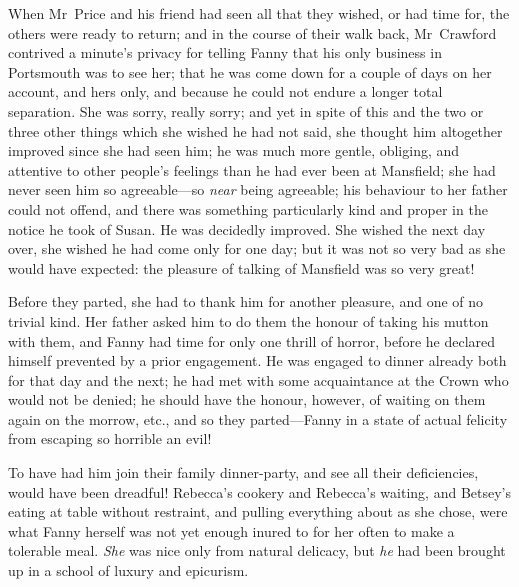 When Mr~Price and his friend had seen all that they wished, or had time for, the others were ready to return; and in the course of their walk back, Mr~Crawford contrived a minute's privacy for telling Fanny that his only business in Portsmouth was to see her; that he was come down for a couple of days on her account, and hers only, and because he could not endure a longer total separation. She was sorry, really sorry; and yet in spite of this and the two or three other things which she wished he had not said, she thought him altogether improved since she had seen him; he was much more gentle, obliging, and attentive to other people's feelings than he had ever been at Mansfield; she had never seen him so agreeable—so \textit{near}  being agreeable; his behaviour to her father could not offend, and there was something particularly kind and proper in the notice he took of Susan. He was decidedly improved. She wished the next day over, she wished he had come only for one day; but it was not so very bad as she would have expected: the pleasure of talking of Mansfield was so very great!

Before they parted, she had to thank him for another pleasure, and one of no trivial kind. Her father asked him to do them the honour of taking his mutton with them, and Fanny had time for only one thrill of horror, before he declared himself prevented by a prior engagement. He was engaged to dinner already both for that day and the next; he had met with some acquaintance at the Crown who would not be denied; he should have the honour, however, of waiting on them again on the morrow, etc., and so they parted—Fanny in a state of actual felicity from escaping so horrible an evil!

To have had him join their family dinner-party, and see all their deficiencies, would have been dreadful! Rebecca's cookery and Rebecca's waiting, and Betsey's eating at table without restraint, and pulling everything about as she chose, were what Fanny herself was not yet enough inured to for her often to make a tolerable meal. \textit{She}  was nice only from natural delicacy, but \textit{he}  had been brought up in a school of luxury and epicurism. 